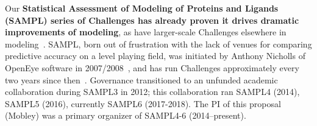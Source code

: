 \documentclass[11pt]{article}
\begin{document}
Our {\bf Statistical Assessment of Modeling of Proteins and Ligands (SAMPL) series of Challenges has already proven it drives dramatic improvements of modeling}, as have larger-scale Challenges elsewhere in modeling~\cite{Saez-Rodriguez:2016:NatRevGenet}.
SAMPL, born out of frustration with the lack of venues for comparing predictive accuracy on a level playing field, was initiated by Anthony Nicholls of OpenEye software in 2007/2008~\cite{nicholls_predicting_2008}, and has run Challenges approximately every two years since then~\cite{nicholls_samp1_2009, mobley_predictions_2009, geballe_sampl2_2010, geballe_sampl3_2012, mobley_blind_2014-1, muddana_sampl4_2014, Bannan:2016:JComputAidedMolDes, yin_overview_2016}.
Governance transitioned to an unfunded academic collaboration during SAMPL3 in 2012; this collaboration ran SAMPL4 (2014), SAMPL5 (2016), currently SAMPL6 (2017-2018). 
The PI of this proposal (Mobley) was a primary organizer of SAMPL4-6 (2014--present).
\end{document}
